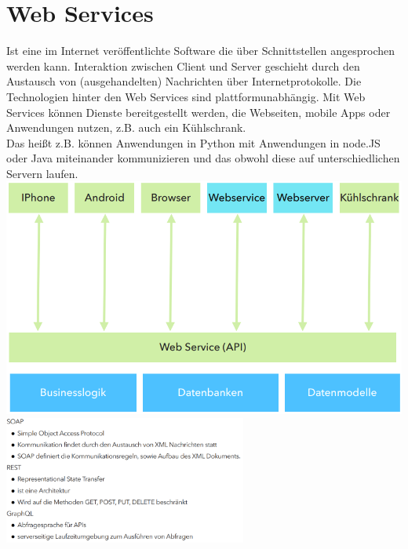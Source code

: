 \documentclass[12pt,a4paper]{article}
\begin{document}
\section{Web Services}
Ist eine im Internet veröffentlichte Software die über Schnittstellen angesprochen werden kann. Interaktion zwischen Client und Server geschieht durch den Austausch von (ausgehandelten) Nachrichten über Internetprotokolle. Die Technologien hinter den Web Services sind plattformunabhängig. Mit Web Services können Dienste bereitgestellt werden, die Webseiten, mobile Apps oder Anwendungen nutzen, z.B. auch ein Kühlschrank.\\
Das heißt z.B. können Anwendungen in Python mit Anwendungen in node.JS oder Java miteinander kommunizieren und das obwohl diese auf unterschiedlichen Servern laufen.\\
\includegraphics[width=\textwidth]{Bilder/webservices.PNG}\\
\includegraphics[width=0.6\textwidth]{Bilder/uebersicht_web_services.PNG}
\end{document}
